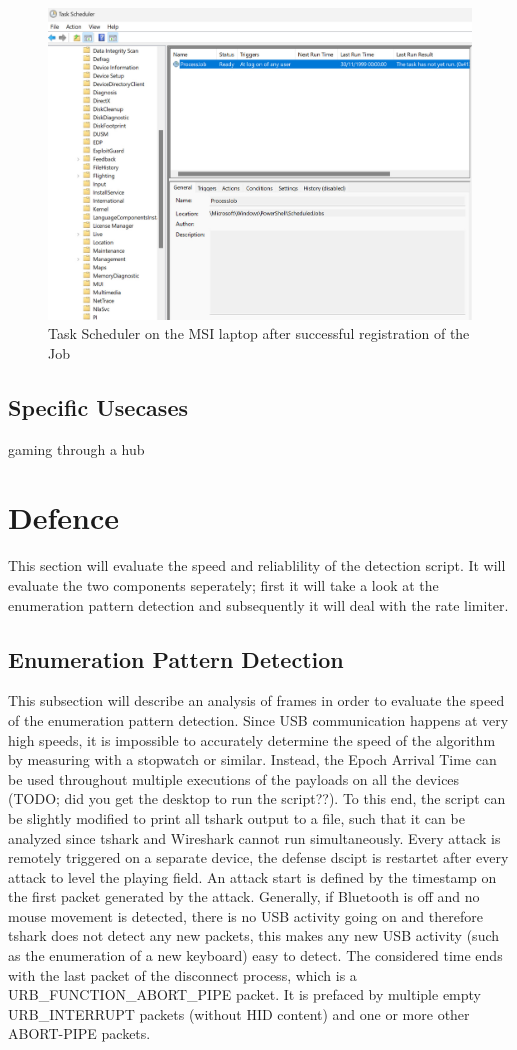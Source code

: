 \begin{figure}[H]
    \centering
    \includegraphics[width=0.5\linewidth]{visuals/task_scheduler_MSI.jpeg}
    \caption{Task Scheduler on the MSI laptop after successful registration of the Job}
    \label{fig:TaskScheduler}
\end{figure}




\subsection{Specific Usecases}

gaming
through a hub



\section{Defence}



This section will evaluate the speed and reliablility of the detection script.
It will evaluate the two components seperately; first it will take a look at the enumeration pattern detection and subsequently it will deal with the rate limiter.


\subsection{Enumeration Pattern Detection}

This subsection will describe an analysis of frames in order to evaluate the speed of the enumeration pattern detection. Since USB communication happens at very high speeds, it is impossible to accurately determine the speed of the algorithm by measuring with a stopwatch or similar. Instead, the Epoch Arrival Time can be used throughout multiple executions of the payloads on all the devices (TODO; did you get the desktop to run the script??). To this end, the script can be slightly modified to print all tshark output to a file, such that it can be analyzed since tshark and Wireshark cannot run simultaneously. Every attack is remotely triggered on a separate device, the defense dscipt is restartet after every attack to level the playing field. An attack start is defined by the timestamp on the first packet generated by the attack. Generally, if Bluetooth is off and no mouse movement is detected, there is no USB activity going on and therefore tshark does not detect any new packets, this makes any new USB activity (such as the enumeration of a new keyboard) easy to detect. The considered time ends with the last packet of the disconnect process, which is a URB_FUNCTION_ABORT_PIPE packet. It is prefaced by multiple empty URB_INTERRUPT packets (without HID content) and one or more other ABORT-PIPE packets. 

